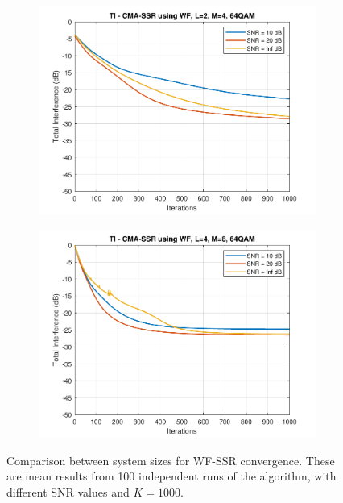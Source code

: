 \begin{figure}
\begin{subfigure}[b]{0.45\textwidth}
		\includegraphics[width=\linewidth]{./figs/BF_WF_TI_64QAM_L=2_M=4_K=1000.pdf}
		\label{fig:wf_ti64_24}
	\end{subfigure}
	\begin{subfigure}[b]{0.45\textwidth}
		\includegraphics[width=\linewidth]{./figs/BF_WF_TI_64QAM_L=4_M=8_K=1000.pdf}
		\label{fig:wf_ti64_48}
	\end{subfigure}
	\caption{Comparison between system sizes for WF-SSR convergence. These are mean results from 100 independent runs of the algorithm, with different SNR values and $K=1000$.}
	\label{fig:CMA_WF_size_qpsk}
\end{figure}

